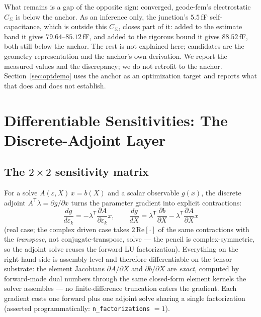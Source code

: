 \documentclass{anvil-paper}
\begin{document}
What remains is a gap of the opposite sign: converged, geode-fem's
electrostatic $C_\Sigma$ is below the anchor. As an inference only, the
junction's $5.5$\,fF self-capacitance, which is outside this
$C_\Sigma$, closes part of it: added to the estimate band it gives
$79.64$--$85.12$\,fF, and added to the rigorous bound it gives
$88.52$\,fF, both still below the anchor. The rest is not explained
here; candidates are the geometry representation and the anchor's own
derivation. We report the measured values and the discrepancy; we do
not retrofit to the anchor. Section~\ref{sec:optdemo} uses the anchor
as an optimization target and reports what that does and does not
establish.

\section{Differentiable Sensitivities: The Discrete-Adjoint Layer}
\label{sec:adjoint}

\subsection{The \texorpdfstring{$2\times 2$}{2x2} sensitivity matrix}
\label{sec:adjoint-matrix}

For a solve $A(\varepsilon, X)\,x = b(X)$ and a scalar observable
$g(x)$, the discrete adjoint $A^{\mathsf{T}}\lambda = \partial g/\partial
x$ turns the parameter gradient into explicit contractions:
\begin{equation}
  \frac{dg}{d\varepsilon_k}
    = -\lambda^{\mathsf{T}}\frac{\partial A}{\partial \varepsilon_k}x,
  \qquad
  \frac{dg}{dX}
    = \lambda^{\mathsf{T}}\frac{\partial b}{\partial X}
      - \lambda^{\mathsf{T}}\frac{\partial A}{\partial X}x
  \label{eq:adjoint}
\end{equation}
(real case; the complex driven case takes $2\,\mathrm{Re}[\cdot]$ of the
same contractions with the \emph{transpose}, not conjugate-transpose,
solve --- the pencil is complex-symmetric, so the adjoint solve reuses
the forward LU factorization). Everything on the right-hand side is
assembly-level and therefore differentiable on the tensor substrate: the
element Jacobians $\partial A/\partial X$ and $\partial b/\partial X$ are
\emph{exact}, computed by forward-mode dual numbers through the same
closed-form element kernels the solver assembles --- no finite-difference
truncation enters the gradient. Each gradient costs one forward plus one
adjoint solve sharing a single factorization (asserted programmatically:
\texttt{n\_factorizations} $= 1$).
\end{document}
